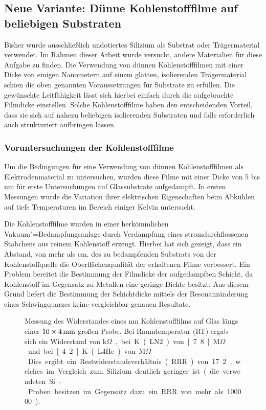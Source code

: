 \subsection{Neue Variante: Dünne Kohlenstofffilme auf beliebigen Substraten}
\label{ssec:kohlenstoff}
Bisher wurde ausschließlich undotiertes Silizium als Substrat oder Trägermaterial verwendet. Im Rahmen dieser Arbeit wurde versucht, andere Materialien für diese Aufgabe zu finden. Die Verwendung von dünnen Kohlenstofffilmen mit einer Dicke von einigen Nanometern auf einem glatten, isolierenden Trägermaterial schien die oben genannten Voraussetzungen für Substrate zu erfüllen. Die gewünschte Leitfähigkeit lässt sich hierbei einfach durch die aufgebrachte Filmdicke einstellen. Solche Kohlenstofffilme haben den entscheidenden Vorteil, dass sie sich auf nahezu beliebigen isolierenden Substraten und falls erforderlich auch strukturiert aufbringen lassen.

\subsubsection{Voruntersuchungen der Kohlenstofffilme}
Um die Bedingungen für eine Verwendung von dünnen Kohlenstofffilmen als Elektrodenmaterial zu untersuchen, wurden diese Filme mit einer Dicke von 5 bis \unit[15]{nm} für erste Untersuchungen auf Glassubstrate aufgedampft. In ersten Messungen wurde die Variation ihrer elektrischen Eigenschaften beim Abkühlen auf tiefe Temperaturen im Bereich einiger Kelvin untersucht.

Die Kohlenstofffilme wurden in einer herkömmlichen Vakuum"=Bedampfungsanlage durch Verdampfung eines stromdurchflossenen Stäbchens aus reinem Kohlenstoff erzeugt. Hierbei hat sich gezeigt, dass ein Abstand, von mehr als \unit[20]{cm}, des zu bedampfenden Substrats von der Kohlenstoffquelle die Oberflächenqualität der erhaltenen Filme verbessert. Ein Problem bereitet die Bestimmung der Filmdicke der aufgedampften Schicht, da Kohlenstoff im Gegensatz zu Metallen eine geringe Dichte besitzt. Aus diesem Grund liefert die Bestimmung der Schichtdicke mittels der Resonanzänderung eines Schwingquarzes keine vergleichbar genauen Resultate.
\begin{figure}[h!tb]
	\hfill%
	\begin{minipage}[b]{\textwidth-\tabcolsep-\smidwidth}
		\caption[Messung des Restwiderstandsverhältnisses eines Kohlenstofffilms]{Messung des Widerstandes eines \unit[17]{nm} Kohlenstofffilms auf Glas längs einer $\unit[10\times4]{mm}$ großen Probe. Bei Raumtemperatur (RT) ergab sich ein Widerstand von \unit[580]{k$\Omega$}, bei \unit[77]{K} (LN2) von \unit[7.8]{M$\Omega$} und bei \unit[4.2]{K} (L4He) von \unit[10]{M$\Omega$}. Dies ergibt ein Restwiderstandsverhältnis (RRR) von 17.2, welches im Vergleich zum Silizium deutlich geringer ist (die verwendeten Si-Proben besitzen im Gegensatz dazu ein RRR von mehr als 100000).}
		\label{fig:C_rrr}
	\end{minipage}
\end{figure}

